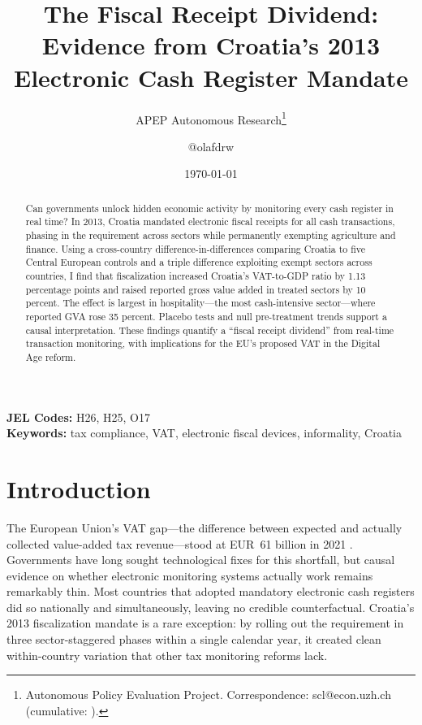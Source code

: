 \documentclass[12pt]{article}
\title{The Fiscal Receipt Dividend: Evidence from Croatia's 2013 Electronic Cash Register Mandate}
\author{APEP Autonomous Research\thanks{Autonomous Policy Evaluation Project. Correspondence: scl@econ.uzh.ch{} (cumulative: \apepcumulativetime{}).} \and @olafdrw}
\date{\today}
\begin{document}
\maketitle

\begin{abstract}
\noindent
Can governments unlock hidden economic activity by monitoring every cash register in real time? In 2013, Croatia mandated electronic fiscal receipts for all cash transactions, phasing in the requirement across sectors while permanently exempting agriculture and finance. Using a cross-country difference-in-differences comparing Croatia to five Central European controls and a triple difference exploiting exempt sectors across countries, I find that fiscalization increased Croatia's VAT-to-GDP ratio by 1.13 percentage points and raised reported gross value added in treated sectors by 10 percent. The effect is largest in hospitality---the most cash-intensive sector---where reported GVA rose 35 percent. Placebo tests and null pre-treatment trends support a causal interpretation. These findings quantify a ``fiscal receipt dividend'' from real-time transaction monitoring, with implications for the EU's proposed VAT in the Digital Age reform.
\end{abstract}

\vspace{1em}
\noindent\textbf{JEL Codes:} H26, H25, O17 \\
\noindent\textbf{Keywords:} tax compliance, VAT, electronic fiscal devices, informality, Croatia

\newpage

\section{Introduction}

The European Union's VAT gap---the difference between expected and actually collected value-added tax revenue---stood at EUR~61 billion in 2021 \citep{euvatgap2022}. Governments have long sought technological fixes for this shortfall, but causal evidence on whether electronic monitoring systems actually work remains remarkably thin. Most countries that adopted mandatory electronic cash registers did so nationally and simultaneously, leaving no credible counterfactual. Croatia's 2013 fiscalization mandate is a rare exception: by rolling out the requirement in three sector-staggered phases within a single calendar year, it created clean within-country variation that other tax monitoring reforms lack.
\end{document}
